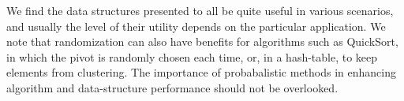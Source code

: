 \documentclass[oribibl]{llncs}
\begin{document}
We find the data structures presented to all be quite useful in various scenarios, and usually the level of their utility depends on the particular application. We note that randomization can also have benefits for algorithms such as QuickSort, in which the pivot is randomly chosen each time, or, in a hash-table, to keep elements from clustering. The importance of probabalistic methods in enhancing algorithm and data-structure performance should not be overlooked.




\end{document}
